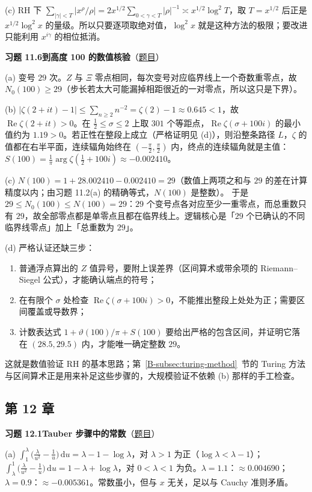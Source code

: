 \documentclass[11pt,a4paper]{article}
\newcommand{\dd}{\,\mathrm{d}}
\renewcommand{\Re}{\operatorname{Re}}
\newcommand{\bref}[1]{\ref*{B-#1}}
\newcommand{\Sol}[2]{%
  \par\addvspace{1.2em}\noindent
  \hypertarget{s:#1}{}\textbf{习题 #1\quad #2}\hfill{\small（\hyperlink{q:#1}{题目}）}\par
  \nopagebreak\smallskip}
\begin{document}
(c) RH 下 $\sum_{|\gamma|<T}|x^\rho/\rho|=2x^{1/2}\sum_{0<\gamma<T}|\rho|^{-1}\asymp x^{1/2}\log^2T$，取 $T=x^{1/2}$ 后正是 $x^{1/2}\log^2x$ 的量级。所以只要逐项取绝对值，$\log^2x$ 就是这种方法的极限；要改进只能利用 $x^{i\gamma}$ 的相位抵消。

\Sol{11.6}{到高度 100 的数值核验}
(a) 变号 $29$ 次。$Z$ 与 $\Xi$ 零点相同，每次变号对应临界线上一个奇数重零点，故 $N_0(100)\ge29$（步长若太大可能漏掉相距很近的一对零点，所以这只是下界）。

(b) $|\zeta(2+it)-1|\le\sum_{n\ge2}n^{-2}=\zeta(2)-1\approx0.645<1$，故 $\Re\zeta(2+it)>0$。在 $\frac12\le\sigma\le2$ 上取 $301$ 个等距点，$\Re\zeta(\sigma+100i)$ 的最小值约为 $1.19>0$。若正性在整段上成立（严格证明见 (d)），则沿整条路径 $L$，$\zeta$ 的值都在右半平面，连续辐角始终在 $(-\frac\pi2,\frac\pi2)$ 内，终点的连续辐角就是主值：$S(100)=\frac1\pi\arg\zeta(\frac12+100i)\approx-0.002410$。

(c) $N(100)=1+28.002410-0.002410=29$（数值上两项之和与 $29$ 的差在计算精度以内；由习题 11.2(a) 的精确等式，$N(100)$ 是整数）。
于是 $29\le N_0(100)\le N(100)=29$：$29$ 个变号点各对应至少一重零点，而总重数只有 $29$，故全部零点都是单零点且都在临界线上。逻辑核心是「$29$ 个已确认的不同临界线零点」加上「总重数为 $29$」。

(d) 严格认证还缺三步：
\begin{enumerate}[label=\arabic*.]
  \item 普通浮点算出的 $Z$ 值异号，要附上误差界（区间算术或带余项的 Riemann--Siegel 公式），才能确认端点的符号；
  \item 在有限个 $\sigma$ 处检查 $\Re\zeta(\sigma+100i)>0$，不能推出整段上处处为正；需要区间覆盖或导数界；
  \item 计数表达式 $1+\vartheta(100)/\pi+S(100)$ 要给出严格的包含区间，并证明它落在 $(28.5,29.5)$ 内，才能唯一确定整数 $29$。
\end{enumerate}
这就是数值验证 RH 的基本思路；第~\bref{subsec:turing-method}~节的 Turing 方法与区间算术正是用来补足这些步骤的，大规模验证不依赖 (b) 那样的手工检查。

\subsection*{第 12 章}

\Sol{12.1}{Tauber 步骤中的常数}
(a) $\int_1^\lambda\bigl(\frac\lambda{u^2}-\frac1u\bigr)\dd u=\lambda-1-\log\lambda$，对 $\lambda>1$ 为正（$\log\lambda<\lambda-1$）；$\int_\lambda^1\bigl(\frac\lambda{u^2}-\frac1u\bigr)\dd u=1-\lambda+\log\lambda$，对 $0<\lambda<1$ 为负。$\lambda=1.1$：$\approx0.004690$；$\lambda=0.9$：$\approx-0.005361$。常数虽小，但与 $x$ 无关，足以与 Cauchy 准则矛盾。
\end{document}
